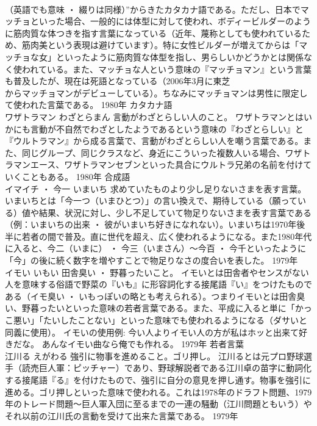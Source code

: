 \documentclass[8pt]{extreport}
\begin{document}
\begin{CJK}{UTF8}{min}
\\	（英語でも意味 ・ 綴りは同様）”からきたカタカナ語である。ただし、日本でマッチョといった場合、一般的には体型に対して使われ、ボディービルダーのように筋肉質な体つきを指す言葉になっている（近年、蔑称としても使われているため、筋肉美という表現は避けています）。特に女性ビルダーが増えてからは「マッチョな女」といったように筋肉質な体型を指し、男らしいかどうかとは関係なく使われている。また、マッチョな人という意味の『マッチョマン』という言葉も普及したが、現在は死語となっている（2006年3月に東芝
\\	からマッチョマンがデビューしている）。ちなみにマッチョマンは男性に限定して使われた言葉である。	1980年	カタカナ語	
\\	ワザトラマン	わざとらまん	言動がわざとらしい人のこと。	ワザトラマンとはいかにも言動が不自然でわざとしたようであるという意味の『わざとらしい』と『ウルトラマン』から成る言葉で、言動がわざとらしい人を嘲う言葉である。また、同じグループ、同じクラスなど、身近にこういった複数人いる場合、ワザトラマンエース、ワザトラマンセブンといった具合にウルトラ兄弟の名前を付けていくこともある。	1980年	合成語	
\\	イマイチ ・ 今一	いまいち	求めていたものより少し足りないさまを表す言葉。	いまいちとは「今一つ（いまひとつ）」の言い換えで、期待している（願っている）値や結果、状況に対し、少し不足していて物足りないさまを表す言葉である（例：いまいちの出来 ・ 彼がいまいち好きになれない）。いまいちは1970年後半に若者の間で普及。直に世代を超え、広く使われるようになる。また1980年代に入ると、今二（いまに） ・ 今三（いまさん）～今百 ・ 今千といったように「今」の後に続く数字を増やすことで物足りなさの度合いを表した。	1979年	
\\	イモい	いもい	田舎臭い ・ 野暮ったいこと。	イモいとは田舎者やセンスがない人を意味する俗語で野菜の『いも』に形容詞化する接尾語『い』をつけたものである（イモ臭い ・ いもっぽいの略とも考えられる）。つまりイモいとは田舎臭い、野暮ったいといった意味の若者言葉である。また、平成に入ると単に「かっこ悪い」「たいしたことない」といった意味でも使われるようになる（ダサいと同義に使用）。 イモいの使用例: 今い人よりイモい人の方が私はホッと出来て好きだな。 あんなイモい曲なら俺でも作れる。	1979年	若者言葉	
\\	江川る	えがわる	強引に物事を進めること。ゴリ押し。	江川るとは元プロ野球選手（読売巨人軍：ピッチャー）であり、野球解説者である江川卓の苗字に動詞化する接尾語『る』を付けたもので、強引に自分の意見を押し通す。物事を強引に進める。ゴリ押しといった意味で使われる。これは1978年のドラフト問題、1979年のトレード問題～巨人軍入団に至るまでの一連の騒動（江川問題ともいう）やそれ以前の江川氏の言動を受けて出来た言葉である。	1979年	

\end{CJK}
\end{document}
